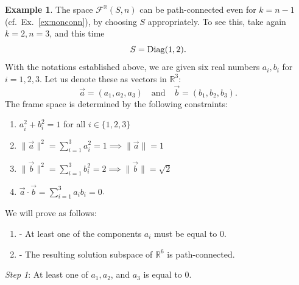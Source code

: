 \documentclass[12pt]{amsart}
\theoremstyle{definition}
\newtheorem{ex}[thm]{Example}
\theoremstyle{remark}
\newcommand{\RR}{\mathbb R}
\begin{document}
\begin{ex} \label{ex:nonconn1} The space ${\mathcal F}^\RR(S, n)$ can be path-connected even for $k=n-1$ (cf.~Ex.~\ref{ex:nonconn}), by choosing $S$ appropriately. To see this,
take again $k=2, n=3$, and this time
$$S={\rm Diag}(1,2).$$
With the notations established above, we are given six real numbers $a_i, b_i$ for $i = 1, 2, 3$. Let us denote these as  vectors in $\mathbb{R}^3$:
\[
\vec{a} = (a_1, a_2, a_3) \quad \text{and} \quad \vec{b} = (b_1, b_2, b_3).
\]
The frame space is determined by the following constraints:
\begin{enumerate}
    \item[$\bullet$] $a_i^2 + b_i^2 = 1$ for all $i \in \{1, 2, 3\}$
    \item[$\bullet$] $\|\vec{a}\|^2 = \sum_{i=1}^3 a_i^2 = 1 \implies \|\vec{a}\| = 1$
    \item[$\bullet$] $\|\vec{b}\|^2 = \sum_{i=1}^3 b_i^2 = 2 \implies \|\vec{b}\| = \sqrt{2}$
    \item[$\bullet$] $\vec{a} \cdot \vec{b} = \sum_{i=1}^3 a_i b_i = 0$.
\end{enumerate}
We will prove as follows:
\begin{enumerate}
    \item[{}] - At least one of the components $a_i$ must be equal to $0$.
    \item[{}] - The resulting solution subspace of $\mathbb{R}^6$ is path-connected.
\end{enumerate}

{\it Step 1}: At least one of $a_1, a_2$, and $a_3$  is equal to 0.


\end{ex}
\end{document}
